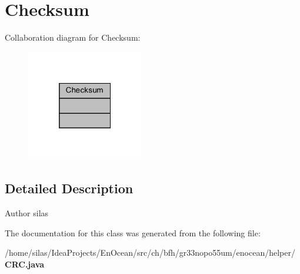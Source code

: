 \section{Checksum}
\label{classChecksum}


Collaboration diagram for Checksum\+:\nopagebreak
\begin{figure}[H]
\begin{center}
\leavevmode
\includegraphics[width=145pt]{d0/d7c/classChecksum__coll__graph}
\end{center}
\end{figure}


\subsection{Detailed Description}
\begin{DoxyAuthor}{Author}
silas 
\end{DoxyAuthor}


The documentation for this class was generated from the following file\+:\begin{DoxyCompactItemize}
\item 
/home/silas/\+Idea\+Projects/\+En\+Ocean/src/ch/bfh/gr33nopo55um/enocean/helper/{\bf C\+R\+C.\+java}\end{DoxyCompactItemize}
